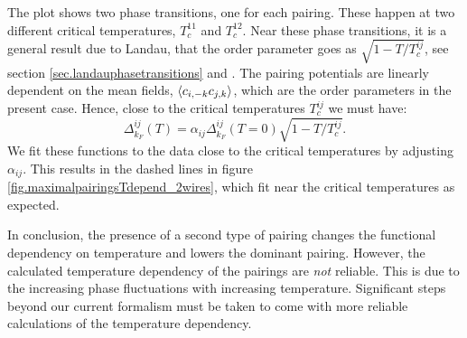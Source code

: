 The plot shows two phase transitions, one for each pairing. These happen at two different critical temperatures, $T^{11}_{c}$ and $T^{12}_{c}$. Near these phase transitions, it is a general result due to Landau, that the order parameter goes as $\sqrt{1 - T/T^{ij}_c}$, see section \ref{sec.landauphasetransitions} and \cite[86-87]{PlischkeStatPhys}. The pairing potentials are linearly dependent on the mean fields, $\braket{c_{i, -k}c_{j,k}}$, which are the order parameters in the present case. Hence, close to the critical temperatures $T^{ij}_c$ we must have:
\begin{equation}
\Delta^{ij}_{k_F}(T) = \alpha_{ij} \Delta^{ij}_{k_F}(T = 0) \sqrt{1 - T/T^{ij}_c}. 
\label{eq.DeltaasymptoteTc}
\end{equation}
We fit these functions to the data close to the critical temperatures by adjusting $\alpha_{ij}$. This results in the dashed lines in figure \ref{fig.maximalpairingsTdepend_2wires}, which fit near the critical temperatures as expected. 

In conclusion, the presence of a second type of pairing changes the functional dependency on temperature and lowers the dominant pairing. However, the calculated temperature dependency of the pairings are \textit{not} reliable. This is due to the increasing phase fluctuations with increasing temperature. Significant steps beyond our current formalism must be taken to come with more reliable calculations of the temperature dependency. 

